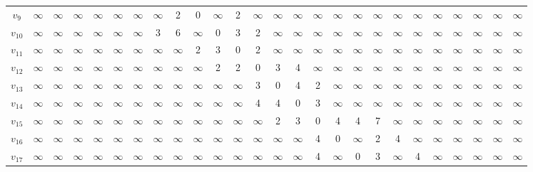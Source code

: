 \begin{tabular}{c|ccccccccccccccccccccccccc}
$v_{9}$ & $\infty$ & $\infty$ & $\infty$ & $\infty$ & $\infty$ & $\infty$ & $\infty$ & 2 & 0 & $\infty$ & 2 & $\infty$ & $\infty$ & $\infty$ & $\infty$ & $\infty$ & $\infty$ & $\infty$ & $\infty$ & $\infty$ & $\infty$ & $\infty$ & $\infty$ & $\infty$ & $\infty$ \\
$v_{10}$ & $\infty$ & $\infty$ & $\infty$ & $\infty$ & $\infty$ & $\infty$ & 3 & 6 & $\infty$ & 0 & 3 & 2 & $\infty$ & $\infty$ & $\infty$ & $\infty$ & $\infty$ & $\infty$ & $\infty$ & $\infty$ & $\infty$ & $\infty$ & $\infty$ & $\infty$ & $\infty$ \\
$v_{11}$ & $\infty$ & $\infty$ & $\infty$ & $\infty$ & $\infty$ & $\infty$ & $\infty$ & $\infty$ & 2 & 3 & 0 & 2 & $\infty$ & $\infty$ & $\infty$ & $\infty$ & $\infty$ & $\infty$ & $\infty$ & $\infty$ & $\infty$ & $\infty$ & $\infty$ & $\infty$ & $\infty$ \\
$v_{12}$ & $\infty$ & $\infty$ & $\infty$ & $\infty$ & $\infty$ & $\infty$ & $\infty$ & $\infty$ & $\infty$ & 2 & 2 & 0 & 3 & 4 & $\infty$ & $\infty$ & $\infty$ & $\infty$ & $\infty$ & $\infty$ & $\infty$ & $\infty$ & $\infty$ & $\infty$ & $\infty$ \\
$v_{13}$ & $\infty$ & $\infty$ & $\infty$ & $\infty$ & $\infty$ & $\infty$ & $\infty$ & $\infty$ & $\infty$ & $\infty$ & $\infty$ & 3 & 0 & 4 & 2 & $\infty$ & $\infty$ & $\infty$ & $\infty$ & $\infty$ & $\infty$ & $\infty$ & $\infty$ & $\infty$ & $\infty$ \\
$v_{14}$ & $\infty$ & $\infty$ & $\infty$ & $\infty$ & $\infty$ & $\infty$ & $\infty$ & $\infty$ & $\infty$ & $\infty$ & $\infty$ & 4 & 4 & 0 & 3 & $\infty$ & $\infty$ & $\infty$ & $\infty$ & $\infty$ & $\infty$ & $\infty$ & $\infty$ & $\infty$ & $\infty$ \\
$v_{15}$ & $\infty$ & $\infty$ & $\infty$ & $\infty$ & $\infty$ & $\infty$ & $\infty$ & $\infty$ & $\infty$ & $\infty$ & $\infty$ & $\infty$ & 2 & 3 & 0 & 4 & 4 & 7 & $\infty$ & $\infty$ & $\infty$ & $\infty$ & $\infty$ & $\infty$ & $\infty$ \\
$v_{16}$ & $\infty$ & $\infty$ & $\infty$ & $\infty$ & $\infty$ & $\infty$ & $\infty$ & $\infty$ & $\infty$ & $\infty$ & $\infty$ & $\infty$ & $\infty$ & $\infty$ & 4 & 0 & $\infty$ & 2 & 4 & $\infty$ & $\infty$ & $\infty$ & $\infty$ & $\infty$ & $\infty$ \\
$v_{17}$ & $\infty$ & $\infty$ & $\infty$ & $\infty$ & $\infty$ & $\infty$ & $\infty$ & $\infty$ & $\infty$ & $\infty$ & $\infty$ & $\infty$ & $\infty$ & $\infty$ & 4 & $\infty$ & 0 & 3 & $\infty$ & 4 & $\infty$ & $\infty$ & $\infty$ & $\infty$ & $\infty$ \\

\end{tabular}
